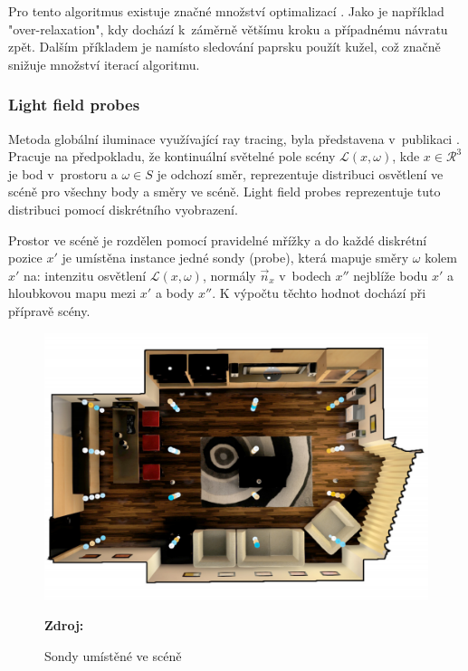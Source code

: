 Pro tento algoritmus existuje značné množství optimalizací \cite{Keinert2014EnhancedST}. Jako je například "over-relaxation", kdy dochází k~záměrně většímu kroku a případnému návratu zpět. Dalším příkladem je namísto sledování paprsku použít kužel, což značně snižuje množství iterací algoritmu.


\subsubsection{Light field probes} \label{sec:light_field_probes}
Metoda globální iluminace využívající ray tracing, byla představena v~publikaci \cite{light_field_probes}. Pracuje na předpokladu, že kontinuální světelné pole scény $\mathcal{L}(x, \omega)$, kde $x \in \mathcal{R}^3$ je bod v~prostoru a $\omega \in S$ je odchozí směr, reprezentuje distribuci osvětlení ve scéně pro všechny body a směry ve scéně. Light field probes reprezentuje tuto distribuci pomocí diskrétního vyobrazení.

Prostor ve scéně je rozdělen pomocí pravidelné mřížky a do každé diskrétní pozice $x'$ je umístěna instance jedné sondy (probe), která mapuje směry $\omega$ kolem $x'$ na: intenzitu osvětlení $\mathcal{L}(x, \omega)$, normály $\vec{n}_x$ v~bodech $x''$ nejblíže bodu $x'$ a hloubkovou mapu mezi $x'$ a body $x''$. K výpočtu těchto hodnot dochází při přípravě scény.

\begin{figure}[H]
	\centering
	\includegraphics[scale=0.25]{obrazky-figures/light_field_probes.png}
	\caption{Sondy umístěné ve scéně}
	\textbf{Zdroj: \cite{light_field_probes}}
	\label{fig:ray_marching}
\end{figure}

